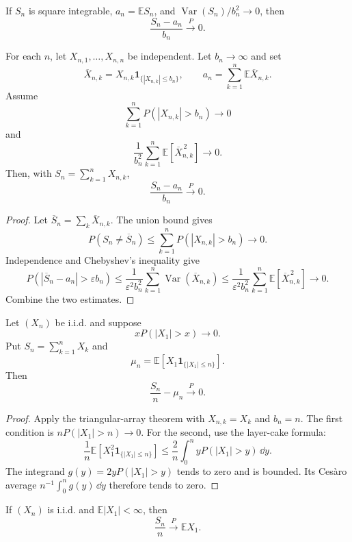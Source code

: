 \begin{prop}
If $S_n$ is square integrable, $a_n=\mathbb E S_n$, and
$\operatorname{Var}(S_n)/b_n^2\to0$, then
\[
\frac{S_n-a_n}{b_n}\xrightarrow{P}0.
\]
\end{prop}

\begin{thm}
For each $n$, let $X_{n,1},\ldots,X_{n,n}$ be independent. Let $b_n\to\infty$
and set
\[
\overline X_{n,k}=X_{n,k}\mathbf1_{\{|X_{n,k}|\leq b_n\}},
\qquad
a_n=\sum_{k=1}^{n}\mathbb E\overline X_{n,k}.
\]
Assume
\[
\sum_{k=1}^{n}P(|X_{n,k}|>b_n)\to0
\]
and
\[
\frac1{b_n^2}\sum_{k=1}^{n}\mathbb E[\overline X_{n,k}^{\,2}]\to0.
\]
Then, with $S_n=\sum_{k=1}^{n}X_{n,k}$,
\[
\frac{S_n-a_n}{b_n}\xrightarrow{P}0.
\]
\end{thm}

\begin{proof}
Let $\overline S_n=\sum_k\overline X_{n,k}$. The union bound gives
\[
P(S_n\neq\overline S_n)
 \leq\sum_{k=1}^{n}P(|X_{n,k}|>b_n)\to0.
\]
Independence and Chebyshev's inequality give
\[
P(|\overline S_n-a_n|>\varepsilon b_n)
 \leq\frac1{\varepsilon^2b_n^2}
      \sum_{k=1}^{n}\operatorname{Var}(\overline X_{n,k})
 \leq\frac1{\varepsilon^2b_n^2}
      \sum_{k=1}^{n}\mathbb E[\overline X_{n,k}^{\,2}]
 \to0.
\]
Combine the two estimates.
\end{proof}

\begin{thm}
Let $(X_n)$ be i.i.d. and suppose
\[
xP(|X_1|>x)\longrightarrow0.
\]
Put $S_n=\sum_{k=1}^{n}X_k$ and
\[
\mu_n=\mathbb E[X_1\mathbf1_{\{|X_1|\leq n\}}].
\]
Then
\[
\frac{S_n}{n}-\mu_n\xrightarrow{P}0.
\]
\end{thm}

\begin{proof}
Apply the triangular-array theorem with $X_{n,k}=X_k$ and $b_n=n$. The first
condition is $nP(|X_1|>n)\to0$. For the second, use the layer-cake formula:
\[
\frac1n\mathbb E[X_1^2\mathbf1_{\{|X_1|\leq n\}}]
 \leq\frac2n\int_0^n yP(|X_1|>y)\,\dd y.
\]
The integrand $g(y)=2yP(|X_1|>y)$ tends to zero and is bounded. Its Ces\`aro
average $n^{-1}\int_0^ng(y)\,\dd y$ therefore tends to zero.
\end{proof}

\begin{cor}
If $(X_n)$ is i.i.d. and $\mathbb E|X_1|<\infty$, then
\[
\frac{S_n}{n}\xrightarrow{P}\mathbb E X_1.
\]
\end{cor}

